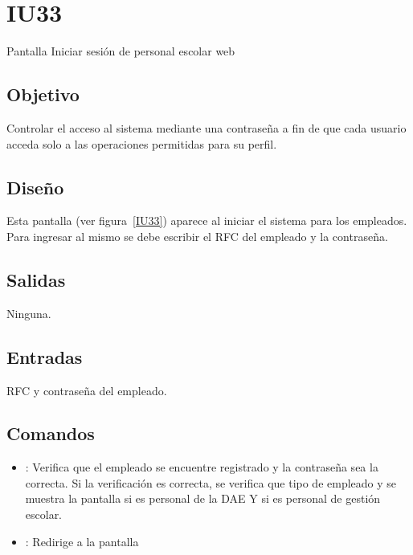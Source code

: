 \section{IU33}{Pantalla Iniciar sesión de personal escolar web}

\subsection{Objetivo}
	Controlar el acceso al sistema mediante una contraseña a fin de que cada usuario acceda solo a las operaciones permitidas para su perfil.

\subsection{Diseño}
	Esta pantalla  (ver figura~\ref{IU33}) aparece al iniciar el sistema para los empleados. Para ingresar al mismo se debe escribir el RFC del empleado y la contraseña. 


\subsection{Salidas}

	Ninguna.

\subsection{Entradas}
	RFC y contraseña del empleado.

\subsection{Comandos}
\begin{itemize}
	\item {}: Verifica que el empleado se encuentre registrado y la contraseña sea la correcta. Si la verificación es correcta, se verifica que tipo de empleado y se muestra la pantalla  si es personal de la DAE Y  si es personal de gestión escolar.
	
	\item {}: Redirige a la pantalla 
	
\end{itemize}

